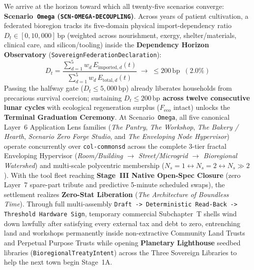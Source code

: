We arrive at the horizon toward which all twenty-five scenarios converge: \textbf{Scenario~\texttt{Omega} (\texttt{SCN-OMEGA-DECOUPLING})}. Across years of patient cultivation, a federated bioregion tracks its five-domain physical import-dependency ratio $D_t \in [0, 10{,}000]\,\mathrm{bp}$ (weighted across nourishment, exergy, shelter/materials, clinical care, and silicon/tooling) inside the \textbf{Dependency Horizon Observatory} (\texttt{SovereignFederationDeclaration}):
\begin{equation}
    D_t = \frac{\sum_{d=1}^{5} w_d \, E_{\mathrm{imported}, d}(t)}{\sum_{d=1}^{5} w_d \, E_{\mathrm{total}, d}(t)} \;\longrightarrow\; \le 200\,\mathrm{bp}\;\; (2.0\%)
    \label{eq:omega-dependency-horizon}
\end{equation}
Passing the halfway gate ($D_t \le 5{,}000\,\mathrm{bp}$) already liberates households from precarious survival coercion; sustaining \textbf{$D_t \le 200\,\mathrm{bp}$ across twelve consecutive lunar cycles} with ecological regeneration surplus ($F_{\mathrm{eco}}$ intact) unlocks the \textbf{Terminal Graduation Ceremony}. At Scenario~\texttt{Omega}, all five canonical Layer~6 Application Lens families (\textit{The Pantry}, \textit{The Workshop}, \textit{The Bakery / Hearth}, \textit{Scenario Zero Forge Studio}, and \textit{The Enveloping Node Hypervisor}) operate concurrently over \texttt{col-commonsd} across the complete 3-tier fractal Enveloping Hypervisor (\textit{Room/Building $\to$ Street/Microgrid $\to$ Bioregional Watershed}) and multi-scale polycentric membership ($N_s = 1 \leftrightarrow N_s = 2 \leftrightarrow N_s \gg 2$). With the tool fleet reaching \textbf{Stage~III Native Open-Spec Closure} (zero Layer~7 spare-part tribute and predictive 5-minute scheduled swaps), the settlement realizes \textbf{Zero-Stat Liberation} (\textit{The Architecture of Boundless Time}). Through full multi-assembly \texttt{Draft -> Deterministic Read-Back -> Threshold Hardware Sign}, temporary commercial Subchapter~T shells wind down lawfully after satisfying every external tax and debt to zero, entrenching land and workshops permanently inside non-extractive Community Land Trusts and Perpetual Purpose Trusts while opening \textbf{Planetary Lighthouse} seedbed libraries (\texttt{BioregionalTreatyIntent}) across the Three Sovereign Libraries to help the next town begin Stage~1A.

